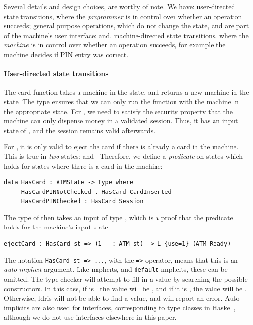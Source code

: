 Several details and design choices, are worthy of note. We have:
user-directed state transitions, where the
\emph{programmer} is in control over whether an operation succeeds;
general purpose operations, which do not change the state, and are part of
the machine's user interface; 
and,
machine-directed state transitions, where the \emph{machine} is in control
over whether an operation succeeds, for example the machine decides if PIN
entry was correct.


\paragraph*{User-directed state transitions}

The  card function takes a machine in the  state,
and returns a new machine in the  state. The type ensures
that we can only run the function with the machine in the appropriate state.
For , we need to satisfy the security property that the machine
can only dispense money in a validated session. Thus, it has an input state
of , and the session remains valid afterwards.

For , it is only valid to eject the card if there is already
a card in the machine. This is true in \emph{two} states: 
and . Therefore, we define a \emph{predicate} on states which
holds for states where there is a card in the machine:

\begin{lstlisting}
data HasCard : ATMState -> Type where
     HasCardPINNotChecked : HasCard CardInserted
     HasCardPINChecked : HasCard Session
\end{lstlisting}

The type of  then takes an input of type ,
which is a proof that the predicate holds for the machine's input state
.

\begin{lstlisting}
ejectCard : HasCard st => (1 _ : ATM st) -> L {use=1} (ATM Ready)
\end{lstlisting}

The notation \texttt{HasCard st => ...}, with the \texttt{=>} operator,
means that this is an \emph{auto implicit} argument. Like implicits,
and \texttt{default} implicits, these can be omitted. The type checker will
attempt to fill in a value by searching the possible constructors. In this
case, if  is , the value will be
, and if it is , the value will be
. Otherwise, Idris will not be able to find a value, and
will report an error.
%
Auto implicits are also used for interfaces,
corresponding to type classes in Haskell, although we do not use interfaces
elsewhere in this paper.

